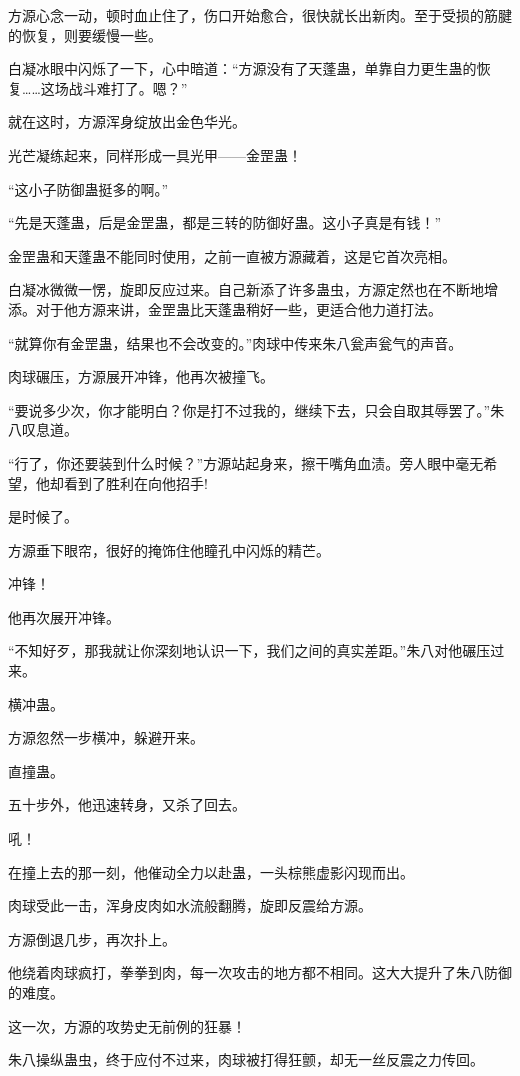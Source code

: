 \begin{this_body}
方源心念一动，顿时血止住了，伤口开始愈合，很快就长出新肉。至于受损的筋腱的恢复，则要缓慢一些。

白凝冰眼中闪烁了一下，心中暗道：“方源没有了天蓬蛊，单靠自力更生蛊的恢复……这场战斗难打了。嗯？”

就在这时，方源浑身绽放出金色华光。

光芒凝练起来，同样形成一具光甲——金罡蛊！

“这小子防御蛊挺多的啊。”

“先是天蓬蛊，后是金罡蛊，都是三转的防御好蛊。这小子真是有钱！”

金罡蛊和天蓬蛊不能同时使用，之前一直被方源藏着，这是它首次亮相。

白凝冰微微一愣，旋即反应过来。自己新添了许多蛊虫，方源定然也在不断地增添。对于他方源来讲，金罡蛊比天蓬蛊稍好一些，更适合他力道打法。

“就算你有金罡蛊，结果也不会改变的。”肉球中传来朱八瓮声瓮气的声音。

肉球碾压，方源展开冲锋，他再次被撞飞。

“要说多少次，你才能明白？你是打不过我的，继续下去，只会自取其辱罢了。”朱八叹息道。

“行了，你还要装到什么时候？”方源站起身来，擦干嘴角血渍。旁人眼中毫无希望，他却看到了胜利在向他招手!

是时候了。

方源垂下眼帘，很好的掩饰住他瞳孔中闪烁的精芒。

冲锋！

他再次展开冲锋。

“不知好歹，那我就让你深刻地认识一下，我们之间的真实差距。”朱八对他碾压过来。

横冲蛊。

方源忽然一步横冲，躲避开来。

直撞蛊。

五十步外，他迅速转身，又杀了回去。

吼！

在撞上去的那一刻，他催动全力以赴蛊，一头棕熊虚影闪现而出。

肉球受此一击，浑身皮肉如水流般翻腾，旋即反震给方源。

方源倒退几步，再次扑上。

他绕着肉球疯打，拳拳到肉，每一次攻击的地方都不相同。这大大提升了朱八防御的难度。

这一次，方源的攻势史无前例的狂暴！

朱八操纵蛊虫，终于应付不过来，肉球被打得狂颤，却无一丝反震之力传回。


\end{this_body}
